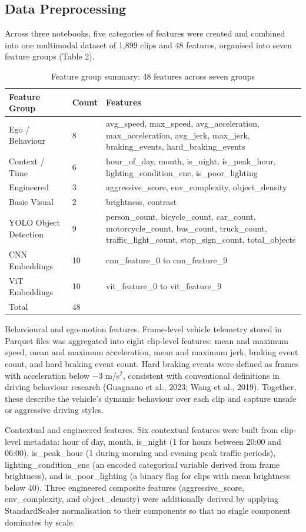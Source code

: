 \documentclass[11pt,a4paper]{article}
\begin{document}
\subsection{Data Preprocessing}

Across three notebooks, five categories of features were created and combined into one multimodal dataset of 1,899 clips and 48 features, organised into seven feature groups (Table 2).

\begin{table}[H]
\centering\small
\caption{Feature group summary: 48 features across seven groups}
\begin{tabularx}{\textwidth}{LLL}
\toprule
\textbf{Feature Group} & \textbf{Count} & \textbf{Features} \\
\midrule
Ego / Behaviour & 8 & avg\_speed, max\_speed, avg\_acceleration, max\_acceleration, avg\_jerk, max\_jerk, braking\_events, hard\_braking\_events \\
Context / Time & 6 & hour\_of\_day, month, is\_night, is\_peak\_hour, lighting\_condition\_enc, is\_poor\_lighting \\
Engineered & 3 & aggressive\_score, env\_complexity, object\_density \\
Basic Visual & 2 & brightness, contrast \\
YOLO Object Detection & 9 & person\_count, bicycle\_count, car\_count, motorcycle\_count, bus\_count, truck\_count, traffic\_light\_count, stop\_sign\_count, total\_objects \\
CNN Embeddings & 10 & cnn\_feature\_0 to cnn\_feature\_9 \\
ViT Embeddings & 10 & vit\_feature\_0 to vit\_feature\_9 \\
Total & 48 &  \\
\bottomrule
\end{tabularx}
\end{table}

Behavioural and ego-motion features. Frame-level vehicle telemetry stored in Parquet files was aggregated into eight clip-level features: mean and maximum speed, mean and maximum acceleration, mean and maximum jerk, braking event count, and hard braking event count. Hard braking events were defined as frames with acceleration below $-$3 m/s$^{2}$, consistent with conventional definitions in driving behaviour research (Guagnano et al., 2023; Wang et al., 2019). Together, these describe the vehicle's dynamic behaviour over each clip and capture unsafe or aggressive driving styles.

Contextual and engineered features. Six contextual features were built from clip-level metadata: hour of day, month, is\_night (1 for hours between 20:00 and 06:00), is\_peak\_hour (1 during morning and evening peak traffic periods), lighting\_condition\_enc (an encoded categorical variable derived from frame brightness), and is\_poor\_lighting (a binary flag for clips with mean brightness below 40). Three engineered composite features (aggressive\_score, env\_complexity, and object\_density) were additionally derived by applying StandardScaler normalisation to their components so that no single component dominates by scale.
\end{document}
